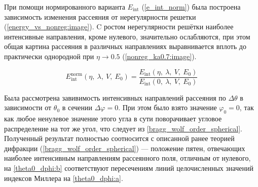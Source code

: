 
При помощи нормированного варианта $E_{\textrm{int}}$ (\autoref{e_int_norm}) была построена зависимость изменения рассеяния от нерегулярности решетки (\autoref{energy_vs_nonreg:image}). C ростом нерегулярности решётки наиболее интенсивные направления, кроме нулевого, значительно ослабляются, при этом общая картина рассеяния в различных направлениях выравнивается вплоть до практически однородной при $\eta \to 0.5$ (\autoref{nonreg_ka0.7:image}).

    \begin{equation}
        E_{\textrm{int}}^{\textrm{norm}} \left( \eta,\:\lambda, \:V, \:E_0 \right) = \frac{E_{\textrm{int}} \left( \eta,\:\lambda, \:V, \:E_0 \right)}{E_{\textrm{int}} \left( 0,\:\lambda, \:V, \:E_0 \right)}\label{e_int_norm}
    \end{equation}


Была рассмотрена завивимость интенсивных направлений рассеяния по $\Delta \theta$ в зависимости от $\theta_0$ в сечении $\Delta \varphi = 0$. При этом было взято значение $\varphi_0 = 0$, так как любое ненулевое значение этого угла в сути поворачивает угловое распределение на тот же угол, что следует из \autoref{bragg_wolf_order_spherical}. Полученный результат полностью соотносится с описанной ранее теорией дифракции (\autoref{bragg_wolf_order_spherical}) --- положение пятен, отвечающих наиболее интенсивным направлениям рассеянного поля, отличным от нулевого, на \autoref{theta0_dphi:b} соответствуют пересечениям линий целочисленных значений индексов Миллера на \autoref{theta0_dphi:a}.

